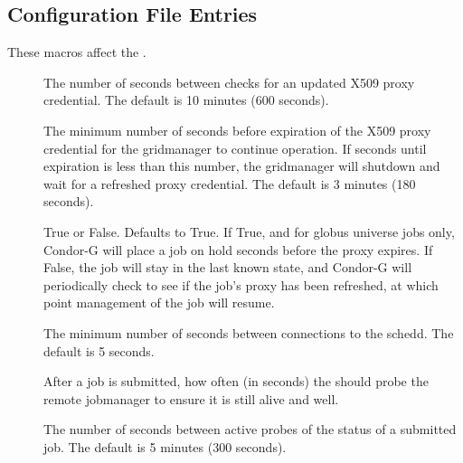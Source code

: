 \subsection{\label{sec:Gridmanager-Config-File-Entries}
 Configuration File Entries}

These macros affect the .
\begin{description}

\item[]
\label{param:GridmanagerCheckproxyInterval} The number of seconds
between checks for an updated X509 proxy credential. The default
is 10 minutes (600 seconds).

\item[]
\label{param:GridmanagerMinimumProxyTime} The minimum number of
seconds before expiration of the X509 proxy credential for the
gridmanager to continue operation. If seconds until expiration is
less than this number, the gridmanager will shutdown and wait for
a refreshed proxy credential. The default is 3 minutes (180 seconds).

\item[]
\label{param:HoldJobIfCredentialExpires} True or False.
Defaults to True.
If True, and for globus universe jobs only,
Condor-G will place a job on hold
 seconds
before the proxy expires.
If False,
the job will stay in the last known state,
and Condor-G will periodically check to see if the job's proxy has been
refreshed, at which point management of the job will resume.

\item[]
\label{param:GridmanagerContactScheddDelay} The minimum number of
seconds between connections to the schedd. The default is 5 seconds.

\item[]
\label{param:GridmanagerJobProbeInterval}
After a job is submitted, how often (in seconds) the 
should probe the remote jobmanager to ensure it is still alive and well.

\item[]
\label{param:GridmanagerJobProbeDelay} The number of seconds between
active probes of the status of a submitted job. The default is 5
minutes (300 seconds).


\end{description}
